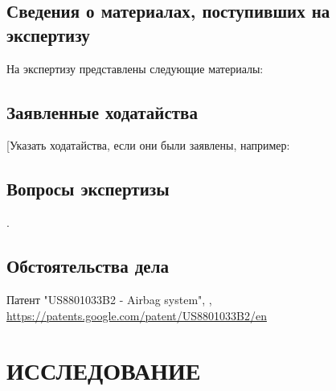 










%
\setcounter{page}{45}



\subsection{Сведения о материалах, поступивших на экспертизу}
На экспертизу представлены следующие материалы:
%


\subsection{Заявленные ходатайства}
[Указать ходатайства, если они были заявлены, например: \\
%


\subsection{Вопросы экспертизы}.
%

\subsection{Обстоятельства дела}
%

\printbibliography
\par
Патент "US8801033B2 - Airbag system", \label{pat:1},  \url{https://patents.google.com/patent/US8801033B2/en}


\section{ИССЛЕДОВАНИЕ}

